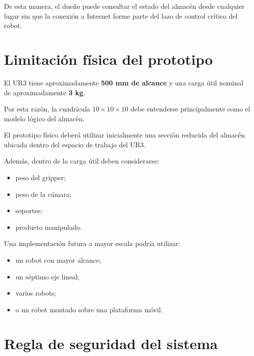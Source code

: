 \documentclass[12pt,letterpaper]{article}
\begin{document}
De esta manera, el dueño puede consultar el estado del almacén desde
cualquier lugar sin que la conexión a Internet forme parte del lazo de
control crítico del robot.

\section{Limitación física del prototipo}

El UR3 tiene aproximadamente \textbf{500 mm de alcance} y una carga útil
nominal de aproximadamente \textbf{3 kg}.

Por esta razón, la cuadrícula $10\times10\times10$ debe entenderse
principalmente como el modelo lógico del almacén.

El prototipo físico deberá utilizar inicialmente una sección reducida
del almacén ubicada dentro del espacio de trabajo del UR3.

Además, dentro de la carga útil deben considerarse:

\begin{itemize}[leftmargin=1.2cm]

    \item peso del gripper;
    \item peso de la cámara;
    \item soportes;
    \item producto manipulado.

\end{itemize}

Una implementación futura a mayor escala podría utilizar:

\begin{itemize}[leftmargin=1.2cm]

    \item un robot con mayor alcance;
    \item un séptimo eje lineal;
    \item varios robots;
    \item o un robot montado sobre una plataforma móvil.

\end{itemize}

\section{Regla de seguridad del sistema}
\end{document}

